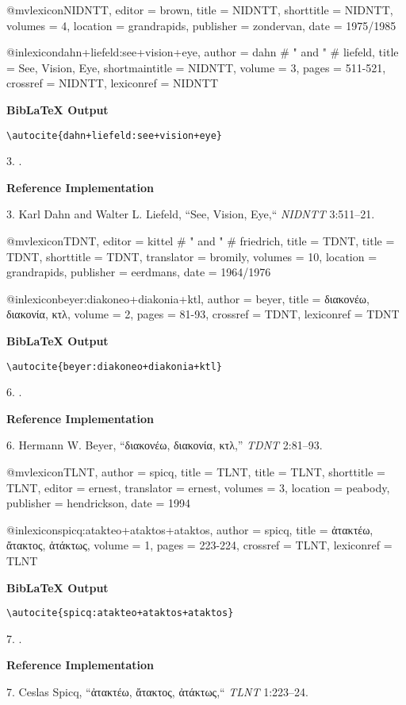 \documentclass[a4paper]{article}
\newcommand{\gr}[1]{{\greekfont #1}}
\newcommand\citetestlex[2]{%
  {\textbf{BibLaTeX Output}\par
   \nobreak
   \texttt{\textbackslash autocite\{#2\}}\par
   \color{biblatex-colour}
   #1. \cite{#2}.\par}}
\newenvironment{refimp}{%
  \begin{minipage}{\linewidth}
    \setlength{\parskip}{1ex}
    \textbf{Reference Implementation}\par
    \nobreak
    \color{reference-colour}
}{\end{minipage}}
\newenvironment{vb}{%
  \setlength{\parskip}{0pt}
  \verbatim}{\endverbatim}
\begin{document}
\begin{vb}
@mvlexicon{NIDNTT,
  editor = brown,
  title = NIDNTT,
  shorttitle = {NIDNTT},
  volumes = {4},
  location = grandrapids,
  publisher = zondervan,
  date = {1975/1985}
}

@inlexicon{dahn+liefeld:see+vision+eye,
  author = dahn # " and " # liefeld,
  title = {See, Vision, Eye},
  shortmaintitle = {NIDNTT},
  volume = {3},
  pages = {511-521},
  crossref = {NIDNTT},
  lexiconref = {NIDNTT}
}
\end{vb}

\citetestlex{3}{dahn+liefeld:see+vision+eye}

\begin{refimp}
  3. Karl Dahn and Walter L. Liefeld, “See, Vision, Eye,“ \emph{NIDNTT} 3:511–21.
\end{refimp}

\begin{vb}
@mvlexicon{TDNT,
  editor = kittel # " and " # friedrich,
  title = TDNT,
  title = TDNT,
  shorttitle = {TDNT},
  translator = bromily,
  volumes = {10},
  location = grandrapids,
  publisher = eerdmans,
  date = {1964/1976}
}

@inlexicon{beyer:diakoneo+diakonia+ktl,
  author = beyer,
  title = {\gr{διακονέω, διακονία, κτλ}},
  volume = {2},
  pages = {81-93},
  crossref = {TDNT},
  lexiconref = {TDNT}
}
\end{vb}
  
\citetestlex{6}{beyer:diakoneo+diakonia+ktl}

\begin{refimp}
  6. Hermann W. Beyer, “\gr{διακονέω, διακονία, κτλ},” \emph{TDNT} 2:81–93.
\end{refimp}

\begin{vb}
@mvlexicon{TLNT,
  author = spicq,
  title = TLNT,
  title = TLNT,
  shorttitle = {TLNT},
  editor = ernest,
  translator = ernest,
  volumes = {3},
  location = peabody,
  publisher = hendrickson,
  date = {1994}
}

@inlexicon{spicq:atakteo+ataktos+ataktos,
  author = spicq,
  title = {\gr{ἀτακτέω, ἄτακτος, ἀτάκτως}},
  volume = {1},
  pages = {223-224},
  crossref = {TLNT},
  lexiconref = {TLNT}
}
\end{vb}

\citetestlex{7}{spicq:atakteo+ataktos+ataktos}

\begin{refimp}
  7. Ceslas Spicq, “\gr{ἀτακτέω, ἄτακτος, ἀτάκτως},“ \emph{TLNT} 1:223–24.
\end{refimp}
\end{document}
